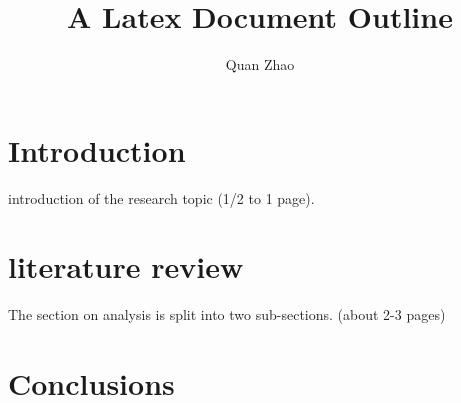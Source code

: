 \documentclass{article}
\begin{document}
\title{A Latex Document Outline}

\author{Quan Zhao}

\maketitle



\section{Introduction}
introduction of the research topic
(1/2 to 1 page).

\section{literature review}
The section on analysis is split into two sub-sections. 
(about 2-3 pages)
\cite{mrc_paper}

\section{Conclusions}


\end{document}
